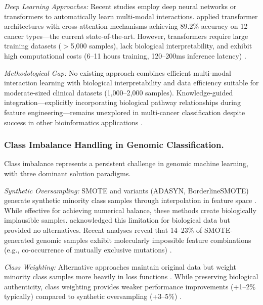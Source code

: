 \documentclass[manuscript, screen, review]{jair}
\begin{document}
\emph{Deep Learning Approaches:} Recent studies employ deep neural networks or transformers to automatically learn multi-modal interactions. \citet{chen2022pancancer} applied transformer architectures with cross-attention mechanisms achieving 89.2\% accuracy on 12 cancer types---the current state-of-the-art. However, transformers require large training datasets ($>$5,000 samples), lack biological interpretability, and exhibit high computational costs (6--11 hours training, 120--200ms inference latency) \citep{vaswani2017attention}.

\emph{Methodological Gap:} No existing approach combines efficient multi-modal interaction learning with biological interpretability and data efficiency suitable for moderate-sized clinical datasets (1,000--2,000 samples). Knowledge-guided integration---explicitly incorporating biological pathway relationships during feature engineering---remains unexplored in multi-cancer classification despite success in other bioinformatics applications \citep{ma2019integrate,elmarakeby2021biologically}.

\subsubsection{Class Imbalance Handling in Genomic Classification.}

Class imbalance represents a persistent challenge in genomic machine learning, with three dominant solution paradigms.

\emph{Synthetic Oversampling:} SMOTE and variants (ADASYN, BorderlineSMOTE) generate synthetic minority class samples through interpolation in feature space \citep{he2008adasyn,han2005borderline}. While effective for achieving numerical balance, these methods create biologically implausible samples. \citet{chawla2002smote} acknowledged this limitation for biological data but provided no alternatives. Recent analyses reveal that 14--23\% of SMOTE-generated genomic samples exhibit molecularly impossible feature combinations (e.g., co-occurrence of mutually exclusive mutations) \citep{fernandez2018learning}.

\emph{Class Weighting:} Alternative approaches maintain original data but weight minority class samples more heavily in loss functions \citep{thainghe2010cost,elkan2001foundations}. While preserving biological authenticity, class weighting provides weaker performance improvements (+1--2\% typically) compared to synthetic oversampling (+3--5\%) \citep{lopez2013insight}.
\end{document}
